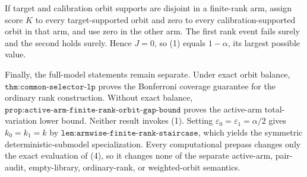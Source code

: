 If target and calibration orbit supports are disjoint in a finite-rank arm, assign score \(K\) to every target-supported orbit and zero to every calibration-supported orbit in that arm, and use zero in the other arm. The first rank event fails surely and the second holds surely. Hence \(J=0\), so (1) equals \(1-\alpha\), its largest possible value.

Finally, the full-model statements remain separate. Under exact orbit balance, \(\texttt{thm:common-selector-lp}\) proves the Bonferroni coverage guarantee for the ordinary rank construction. Without exact balance, \(\texttt{prop:active-arm-finite-rank-orbit-gap-bound}\) proves the active-arm total-variation lower bound. Neither result invokes (1). Setting \(\varepsilon_0=\varepsilon_1=\alpha/2\) gives \(k_0=k_1=k\) by \(\texttt{lem:armwise-finite-rank-staircase}\), which yields the symmetric deterministic-submodel specialization. Every computational prepass changes only the exact evaluation of (4), so it changes none of the separate active-arm, pair-audit, empty-library, ordinary-rank, or weighted-orbit semantics.